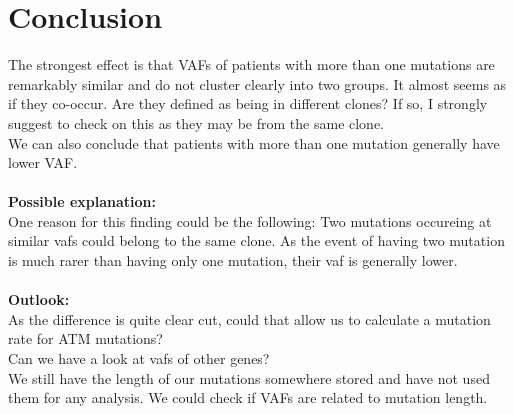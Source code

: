 \documentclass[a4paper,11pt]{article}
\begin{document}
\section*{Conclusion}
The strongest effect is that VAFs of patients with more than one mutations are remarkably similar and do not cluster clearly into two groups. It almost seems as if they co-occur. Are they defined as being in different clones? If so, I strongly suggest to check on this as they may be from the same clone.\\
We can also conclude that patients with more than one mutation generally have lower VAF.\\
\\
\textbf{Possible explanation:}\\
One reason for this finding could be the following: Two mutations occureing at similar vafs could belong to the same clone. As the event of having two mutation is much rarer than having only one mutation, their vaf is generally lower.\\
\\
\textbf{Outlook:}\\
As the difference is quite clear cut, could that allow us to calculate a mutation rate for ATM mutations?\\
Can we have a look at vafs of other genes?\\
We still have the length of our mutations somewhere stored and have not used them for any analysis. We could check if VAFs are related to mutation length.






\end{document}
